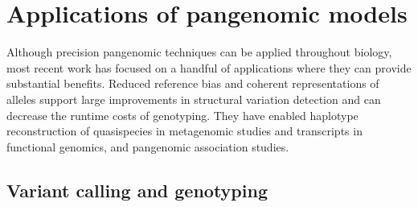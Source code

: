 \section{Applications of pangenomic models}

Although precision pangenomic techniques can be applied throughout biology, most recent work has focused on a handful of applications where they can provide substantial benefits.
Reduced reference bias and coherent representations of alleles support large improvements in structural variation detection and can decrease the runtime costs of genotyping.
They have enabled haplotype reconstruction of quasispecies in metagenomic studies and transcripts in functional genomics, and pangenomic association studies.



\subsection{Variant calling and genotyping}
\label{sec:variantcalling}


